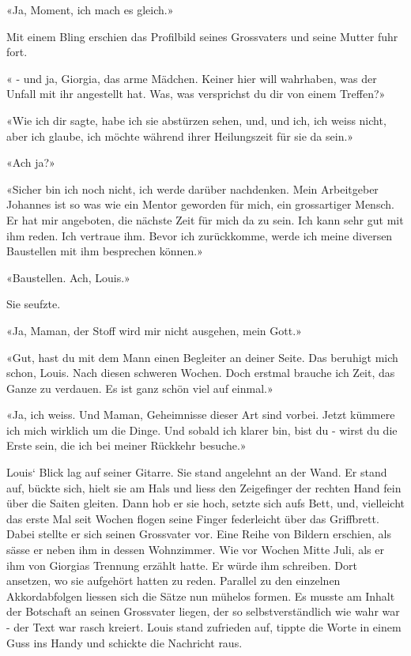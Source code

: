 «Ja, Moment, ich mach es gleich.»

Mit einem Bling erschien das Profilbild seines Grossvaters und seine Mutter fuhr fort.

« - und ja, Giorgia, das arme Mädchen. Keiner hier will wahrhaben, was der
Unfall mit ihr angestellt hat. Was, was versprichst du dir von einem
Treffen?»

«Wie ich dir sagte, habe ich sie abstürzen sehen, und, und ich, ich
weiss nicht, aber ich glaube, ich möchte während ihrer Heilungszeit für
sie da sein.»

«Ach ja?»

«Sicher bin ich noch nicht, ich werde darüber nachdenken. Mein
Arbeitgeber Johannes ist so was wie ein Mentor geworden für mich, ein
grossartiger Mensch. Er hat mir angeboten, die nächste Zeit für mich da
zu sein. Ich kann sehr gut mit ihm reden. Ich vertraue ihm. Bevor ich
zurückkomme, werde ich meine diversen Baustellen mit ihm besprechen
können.»

«Baustellen. Ach, Louis.»

Sie seufzte.

«Ja, Maman, der Stoff wird mir nicht ausgehen, mein Gott.»

«Gut, hast du mit dem Mann einen Begleiter an deiner Seite. Das beruhigt
mich schon, Louis. Nach diesen schweren Wochen. Doch erstmal brauche ich Zeit,
das Ganze zu verdauen. Es ist ganz schön viel auf einmal.»

«Ja, ich weiss. Und Maman, Geheimnisse dieser Art sind vorbei. Jetzt
kümmere ich mich wirklich um die Dinge. Und sobald ich klarer bin, bist
du - wirst du die Erste sein, die ich bei meiner Rückkehr besuche.»

\sectionbreak

Louis` Blick lag auf seiner Gitarre. Sie stand angelehnt an der Wand. Er stand auf, bückte sich, hielt sie am Hals und liess den Zeigefinger der rechten Hand fein über die Saiten gleiten. Dann hob er sie hoch, setzte sich aufs Bett, und, vielleicht das erste Mal seit Wochen flogen seine Finger federleicht über das Griffbrett. Dabei stellte er sich seinen Grossvater vor. Eine Reihe von Bildern erschien, als sässe er neben ihm in dessen Wohnzimmer. Wie vor Wochen Mitte Juli, als er ihm von Giorgias Trennung erzählt hatte. Er würde ihm schreiben. Dort ansetzen, wo sie aufgehört hatten zu reden. Parallel zu den einzelnen Akkordabfolgen liessen sich die Sätze nun mühelos formen. Es musste am Inhalt der Botschaft an seinen Grossvater liegen, der so selbstverständlich wie wahr war - der Text war rasch kreiert. Louis stand zufrieden auf, tippte die Worte in einem Guss ins Handy und schickte die Nachricht raus.









